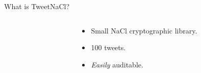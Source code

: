 \documentclass[8pt,aspectratio=169]{beamer}
\begin{document}
\begin{frame}{What is TweetNaCl?}
\begin{columns}
\begin{column}{0.5\textwidth}
\begin{overprint}
			\end{overprint}
		\end{column}
		\begin{column}{0.4\textwidth}
			\begin{itemize}
				\item Small NaCl cryptographic library.
				\item 100 tweets.
				\item \textit{Easily} auditable.
			\end{itemize}
		\end{column}
	\end{columns}
\end{frame}


%
%





\end{document}
